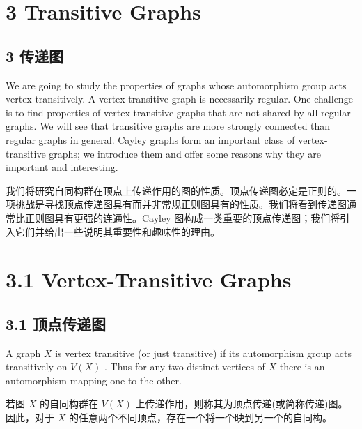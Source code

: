 \documentclass[10pt]{article}
\begin{document}
\section*{3 Transitive Graphs}

\begin{tcolorbox}\relax
\section*{3 传递图}
\end{tcolorbox}

We are going to study the properties of graphs whose automorphism group acts vertex transitively. A vertex-transitive graph is necessarily regular. One challenge is to find properties of vertex-transitive graphs that are not shared by all regular graphs. We will see that transitive graphs are more strongly connected than regular graphs in general. Cayley graphs form an important class of vertex-transitive graphs; we introduce them and offer some reasons why they are important and interesting.

\begin{tcolorbox}\relax
我们将研究自同构群在顶点上传递作用的图的性质。顶点传递图必定是正则的。一项挑战是寻找顶点传递图具有而并非常规正则图具有的性质。我们将看到传递图通常比正则图具有更强的连通性。Cayley 图构成一类重要的顶点传递图；我们将引入它们并给出一些说明其重要性和趣味性的理由。
\end{tcolorbox}

\section*{3.1 Vertex-Transitive Graphs}

\begin{tcolorbox}\relax
\section*{3.1 顶点传递图}
\end{tcolorbox}

A graph \(X\) is vertex transitive (or just transitive) if its automorphism group acts transitively on \(V\left( X\right)\) . Thus for any two distinct vertices of \(X\) there is an automorphism mapping one to the other.

\begin{tcolorbox}\relax
若图 \(X\) 的自同构群在 \(V\left( X\right)\) 上传递作用，则称其为顶点传递(或简称传递)图。因此，对于 \(X\) 的任意两个不同顶点，存在一个将一个映到另一个的自同构。
\end{tcolorbox}
\end{document}
